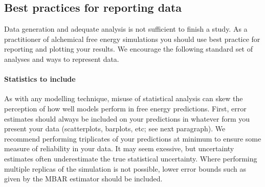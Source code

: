 \documentclass[9pt,bestpractices]{livecoms}
\begin{document}
\subsection{Best practices for reporting data }
\label{sec:plot_data}
Data generation and adequate analysis is not sufficient to finish a study. As a practitioner of alchemical free energy simulations you should use best practice for reporting and plotting your results. We  encourage the following standard set of analyses and ways to represent data. 
\paragraph{Statistics to include}
As with any modelling technique, misuse of statistical analysis can skew the perception of how well models perform in free energy predictions. First, error estimates should always be included on your predictions in whatever form you present your data (scatterplots, barplots, etc; see next paragraph). We recommend performing triplicates of your predictions at minimum to ensure some measure of reliability in your data. It may seem exessive, but  uncertainty estimates often underestimate the true statistical uncertainty. Where performing multiple replicas of the simulation is not possible, lower error bounds such as given by the MBAR estimator should be included. 
\end{document}

